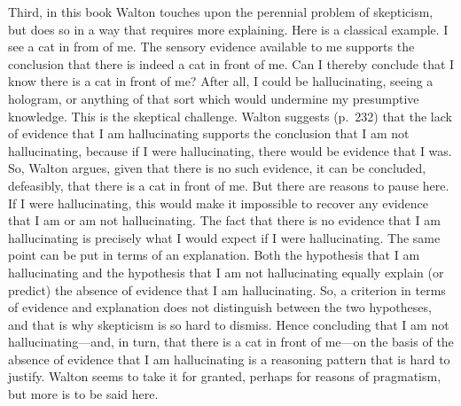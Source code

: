 \documentclass[12pt,a4paper]{article}
\begin{document}
Third, in this book Walton touches upon the 
perennial problem of skepticism, but does so in a way that requires 
more explaining. Here is a classical example. 
I see a cat in from of me. The sensory evidence available to me supports 
the conclusion that there is indeed a cat in front of me. 
Can I thereby conclude that I know there is a cat in front of me?
After all, I could be hallucinating, seeing a hologram, or anything of 
that sort which would undermine my presumptive knowledge. This is the skeptical challenge.
Walton suggests (p.\ 232) that the lack of evidence that I am hallucinating supports the conclusion
that I am not hallucinating, because if I were hallucinating, there would be
evidence that I was. So, Walton argues, given that there is no such
evidence, it can be concluded, defeasibly, that 
there is a cat in front of me.  
But there are reasons to pause here. If I were hallucinating, this would make 
it impossible to recover any evidence that I am or am not hallucinating. The fact that there is no
evidence that I am hallucinating is precisely what I would expect if I
were hallucinating. The same point can be put in terms of an explanation. 
Both the hypothesis that I am hallucinating and the hypothesis that I am not hallucinating 
equally explain (or predict) the absence of evidence that I am hallucinating.
So, a criterion in terms of evidence and explanation does not distinguish between the two hypotheses, and that is why skepticism is so hard to dismiss.
Hence concluding that I am not hallucinating---and, in turn, that 
there is a cat in front of me---on the basis of the absence of evidence that I am hallucinating is a reasoning pattern that is hard to justify. Walton seems to take it for granted, perhaps for reasons of pragmatism, but more is to be said here. 
\end{document}
